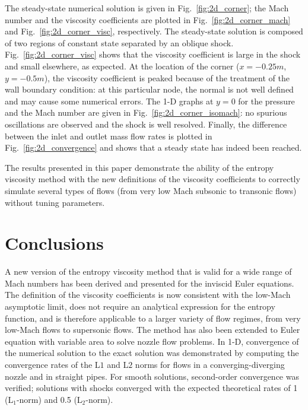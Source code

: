 \documentclass[review,10pt]{elsarticle}
\newcommand{\fig}[1]{Fig.~\ref{#1}}                      %
\begin{document}
%
The steady-state numerical solution is given in \fig{fig:2d_corner}; the Mach number and the viscosity 
coefficients are plotted in \fig{fig:2d_corner_mach} and \fig{fig:2d_corner_visc}, respectively. The 
steady-state solution is composed of two regions of constant state separated by an oblique shock. 
\fig{fig:2d_corner_visc} shows that the viscosity coefficient is large in the shock and small elsewhere, 
as expected. At the location of the corner ($x=-0.25m$, $y=-0.5m$), the viscosity coefficient is peaked 
because of the treatment of the wall boundary condition: at this particular node, the normal is not well 
defined and may cause some numerical errors. The 1-D graphs at $y=0$ for the pressure and the Mach number 
are given in \fig{fig:2d_corner_isomach}: no spurious oscillations are observed and the shock is well resolved. 
Finally, the difference between the inlet and outlet mass flow rates is plotted in \fig{fig:2d_convergence} 
and shows that a steady state has indeed been reached. 

The results presented in this paper demonstrate the ability of the entropy viscosity method with the new definitions of the viscosity coefficients 
to correctly simulate several types of flows (from very low Mach subsonic to transonic flows) without tuning parameters.


\section{Conclusions} \label{sec:ccl}

A new version of the entropy viscosity method that is valid for a wide range of Mach numbers has been derived 
and presented for the inviscid Euler equations.
The definition of the viscosity coefficients
is now consistent with the low-Mach asymptotic limit, does not require an analytical expression 
for the entropy function, and is therefore applicable to a larger variety of flow regimes, from very 
low-Mach flows to supersonic flows. 
The method has also been extended to Euler equation with variable area to solve nozzle flow problems.
In 1-D, convergence of the numerical solution to 
the exact solution was demonstrated by computing the convergence rates of the L$1$ and L$2$ norms 
for flows in a converging-diverging nozzle and in straight pipes. For smooth solutions, second-order 
convergence was verified; solutions with shocks converged with the expected theoretical rates of 1 (L$_1$-norm)
and 0.5 (L$_2$-norm).
\end{document}
